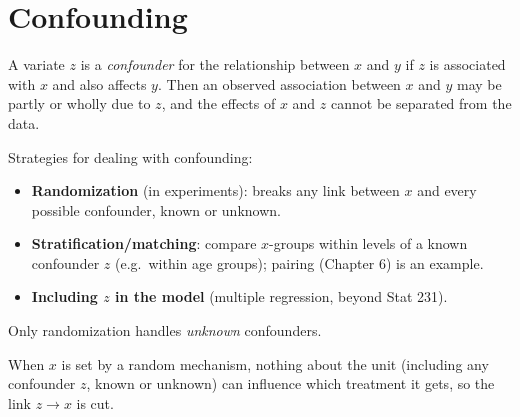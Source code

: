 \section{Confounding}

\begin{definition}
A variate $z$ is a \emph{confounder} for the relationship between $x$ and $y$ if $z$ is
associated with $x$ and also affects $y$. Then an observed association between $x$ and
$y$ may be partly or wholly due to $z$, and the effects of $x$ and $z$ cannot be separated
from the data.
\end{definition}

\begin{center}
\end{center}

Strategies for dealing with confounding:
\begin{itemize}
  \item \textbf{Randomization} (in experiments): breaks any link between $x$ and every
        possible confounder, known or unknown.
  \item \textbf{Stratification/matching}: compare $x$-groups within levels of a known
        confounder $z$ (e.g.\ within age groups); pairing (Chapter 6) is an example.
  \item \textbf{Including $z$ in the model} (multiple regression, beyond Stat 231).
\end{itemize}
Only randomization handles \emph{unknown} confounders.

\begin{center}
\end{center}
When $x$ is set by a random mechanism, nothing about the unit (including any confounder
$z$, known or unknown) can influence which treatment it gets, so the link $z\to x$ is cut.

